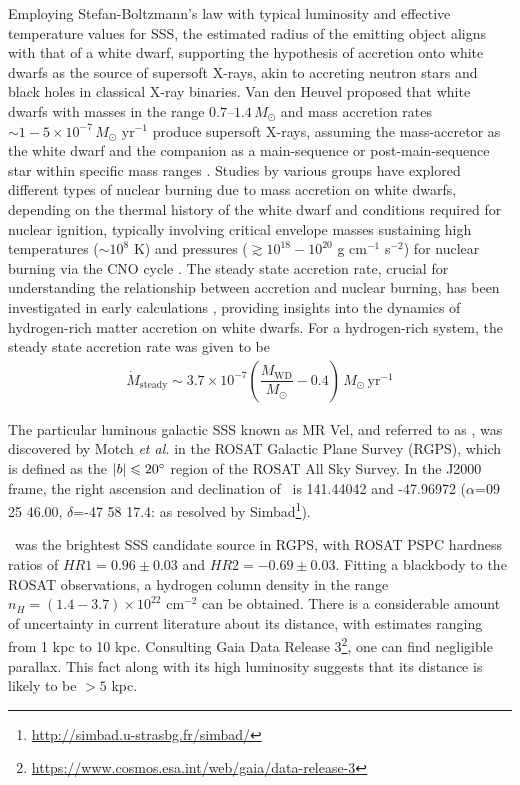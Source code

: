     	Employing Stefan-Boltzmann's law with typical luminosity and effective temperature values for SSS, the estimated radius of the emitting object aligns with that of a white dwarf, supporting the hypothesis of accretion onto white dwarfs as the source of supersoft X-rays, akin to accreting neutron stars and black holes in classical X-ray binaries. Van den Heuvel proposed that white dwarfs with masses in the range $0.7–1.4\,M_\odot$ and mass accretion rates $\sim 1-5\times 10^{-7}\,M_\odot\text{ yr}^{-1}$ produce supersoft X-rays, assuming the mass-accretor as the white dwarf and the companion as a main-sequence or post-main-sequence star within specific mass ranges \cite{van1992accreting}. Studies by various groups have explored different types of nuclear burning due to mass accretion on white dwarfs, depending on the thermal history of the white dwarf and conditions required for nuclear ignition, typically involving critical envelope masses %
    sustaining high temperatures ($\sim 10^8$ K) and pressures ($\gtrsim 10^{18}-10^{20}$ g cm$^{-1}$ s$^{-2}$) for nuclear burning via the CNO cycle \cite{paczynski78,prialnik78,sion79,sienkiewicz80,nomoto82,fujimoto82a,fujimoto82b,iben82,prialnik95,macdonald83}. The steady state accretion rate, crucial for understanding the relationship between accretion and nuclear burning, has been investigated in early calculations \cite{paczynski80,iben82}, providing insights into the dynamics of hydrogen-rich matter accretion on white dwarfs. For a hydrogen-rich system, the steady state accretion rate was given to be \cite{hachisu2001}
		\begin{align}
			\dot{M}_\text{steady}\sim 3.7\times 10^{-7}\left( \dfrac{M_\text{WD}}{M_\odot}-0.4 \right)\,M_\odot\,\text{yr}^{-1} \label{eqn:steady-mass-accr}
		\end{align}
	
		The particular luminous galactic SSS known as MR Vel, and referred to as \source, was discovered by Motch \textit{et al.} \cite{motch1994} in the ROSAT Galactic Plane Survey (RGPS), which  is defined as the $|b|\leqslant 20\degree$ region of the ROSAT All Sky Survey. In the J2000 frame, the right ascension and declination of \source\ is 141.44042 and -47.96972 ($\alpha$=09 25 46.00, $\delta$=-47 58 17.4: as resolved by Simbad\footnote{\url{http://simbad.u-strasbg.fr/simbad/}}).
		
		\source\ was the brightest SSS candidate source in RGPS, with ROSAT PSPC hardness ratios of $HR1=0.96\pm 0.03$ and $HR2=-0.69\pm 0.03$. Fitting a blackbody to the ROSAT observations, a hydrogen column density in the range $n_H=(1.4-3.7)\times 10^{22}$ cm$^{-2}$ can be obtained. There is a considerable amount of uncertainty in current literature about its distance, with estimates ranging from 1 kpc to 10 kpc. Consulting Gaia Data Release 3\footnote{\url{https://www.cosmos.esa.int/web/gaia/data-release-3}}, one can find negligible parallax. This fact along with its high luminosity suggests that its distance is likely to be $>5$ kpc.
		
